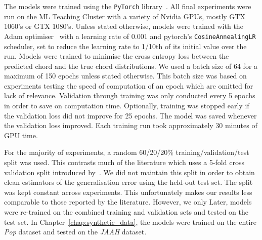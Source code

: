 The models were trained using the \texttt{PyTorch} library~\citep{pytorch}. All final experiments were run on the ML Teaching Cluster with a variety of Nvidia GPUs, mostly GTX 1060's or GTX 1080's. Unless stated otherwise, models were trained with the Adam optimiser~\citep{adam} with a learning rate of $0.001$ and pytorch's \texttt{CosineAnnealingLR} scheduler, set to reduce the learning rate to 1/10th of its initial value over the run. Models were trained to minimise the cross entropy loss between the predicted chord and the true chord distributions. We used a batch size of 64 for a maximum of 150 epochs unless stated otherwise. This batch size was based on experiments testing the speed of computation of an epoch which are omitted for lack of relevance. Validation through training was only conducted every 5 epochs in order to save on computation time. Optionally, training was stopped early if the validation loss did not improve for 25 epochs. The model was saved whenever the validation loss improved. Each training run took approximately 30 minutes of GPU time. 

For the majority of experiments, a random 60/20/20\% training/validation/test split was used. This contrasts much of the literature which uses a 5-fold cross validation split introduced by~\citet{FourTimelyInsights}. We did not maintain this split in order to obtain clean estimators of the generalisation error using the held-out test set. The split was kept constant across experiments. This unfortunately makes our results less comparable to those reported by the literature. However, we only  Later, models were re-trained on the combined training and validation sets and tested on the test set. In Chapter~\ref{chap:synthetic_data}, the models were trained on the entire \emph{Pop} dataset and tested on the \emph{JAAH} dataset.